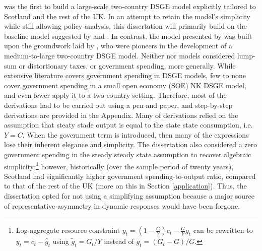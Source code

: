 \textcite{ricci_2019_essays} was the first to build a large-scale two-country DSGE model explicitly tailored to Scotland and the rest of the UK. In an attempt to retain the model's simplicity while still allowing policy analysis, this dissertation will primarily build on the baseline model suggested by \textcite{gali_2005_monetary} and \textcite{jordigal_2015_monetary}. In contrast, the model presented by \textcite{ricci_2019_essays} was built upon the groundwork laid by \textcite{rabanal_2010_eurodollar}, who were pioneers in the development of a medium-to-large two-country DSGE model. Neither \textcite{gali_2005_monetary} nor \textcite{jordigal_2015_monetary} models considered lump-sum or distortionary taxes, or government spending, more generally. While extensive literature covers government spending in DSGE models, few to none cover government spending in a small open economy (SOE) NK DSGE model, and even fewer apply it to a two-country setting. Therefore, most of the derivations had to be carried out using a pen and paper, and step-by-step derivations are provided in the Appendix. Many of \citereset\textcite{jordigal_2015_monetary} derivations relied on the assumption that steaty stade output is equal to the state state consumption, i.e. $Y=C$. When the government term is introduced, then many of the expressions lose their inherent elegance and simplicity. The dissertation also considered a zero government spending in the steady steady state assumption to recover algebraic simplicity;\enlargethispage{\baselineskip}\footnote{Log aggregate resource constraint $y_t = \left( 1 - \frac{G}{Y}\right)c_t - \frac{G}{Y}g_t$ can be rewritten to $y_t = c_t - \hat{g}_t$ using $\tilde{g}_t = G_t/Y$ instead of $g_t = (G_t - G)/G$.} however, historically (over the sample period of twenty years), Scotland had significantly higher government spending-to-output ratio, compared to that of the rest of the UK (more on this in Section \ref{application}). Thus, the dissertation opted for not using a simplifying assumption because a major source of representative asymmetry in dynamic responses would have been forgone.

